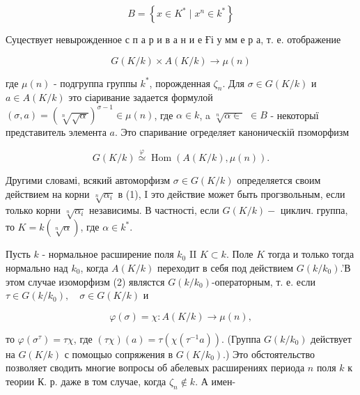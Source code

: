 \documentclass[10pt]{article}
\begin{document}
\[

B=\left\{x \in K^{*} \mid x^{n} \in k^{*}\right\}

\]



Суцествует невырожденное с п а р и в а н и е Ғі у мм е р а, т. е. отображение



\[

G(K / k) \times A(K / k) \longrightarrow \mu(n)

\]



где $\mu(n)$ - подгруппа группы $k^{*}$, порожденная $\zeta_{n}$. Для $\sigma \in G(K / k)$ и $a \in A(K / k)$ это сіаривание задается формулой $(\sigma, a)=(\sqrt[n]{\sqrt{\alpha}})^{\sigma-1} \in \mu(n)$, где $\alpha \in k$, a $\sqrt[n]{\alpha \in}$ $\in B$ - некоторыї представитель элемента $a$. Это спаривание огределяет каноническіӥ пзоморфизм



\[

G(K / k) \stackrel{\varphi}{\simeq} \operatorname{Hom}(A(K / k), \mu(n)) .

\]



Другими словамі, всякий автоморфизм $\sigma \in G(K / k)$ определяется своим действием на корни $\sqrt[n]{\alpha_{i}}$ в (1), I это действие может быть прогзвольным, если только корни $\sqrt[n]{\alpha_{i}}$ независимы. В частності, если $G(K / k)-$ циклич. группа, то $K=k(\sqrt[n]{\alpha})$, где $\alpha \in k^{*}$.



Пусть $k$ - нормальное расширение поля $k_{0}$ II $K \subset k$. Поле $K$ тогда и только тогда нормально над $k_{0}$, когда $A(K / k)$ переходит в себя под действием $G\left(k / k_{0}\right)$.'В этом случае изоморфизм (2) являстся $G\left(k / k_{0}\right)$-операторным, т. е. если $\tau \in G\left(k / k_{0}\right), \quad \sigma \in G(K / k)$ и



\[

\varphi(\sigma)=\chi: A(K / k) \longrightarrow \mu(n),

\]



то $\varphi\left(\sigma^{\tau}\right)=\tau \chi$, где $(\tau \chi)(a)=\tau\left(\chi\left(\tau^{-1} a\right)\right)$. (Группа $G\left(k / k_{0}\right)$ действует на $G(K / k)$ с помощыо сопряжения в $G\left(K / k_{0}\right)$.) Это обстоятельство позволяет сводить многие вопросы об абелевых расширениях периода $n$ поля $k$ к теории К. р. даже в том случае, когда $\zeta_{n} \notin k$. А имен-
\end{document}
